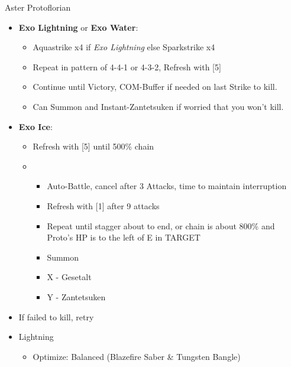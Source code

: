 \begin{battle}[1:43]{Aster Protoflorian}
\begin{itemize}
\begin{itemize}
				      \item \stagger
			      \end{itemize}
			\item \textbf{Exo Lightning} or \textbf{Exo Water}:
			      \begin{itemize}
				      \item Aquastrike x4 if \textit{Exo Lightning} else Sparkstrike x4
				      \item Repeat in pattern of 4-4-1 or 4-3-2, Refresh with [5]
				      \item Continue until Victory, COM-Buffer if needed on last Strike to kill.
				      \item Can Summon and Instant-Zantetsuken if worried that you won't kill.
			      \end{itemize}
			\item \textbf{Exo Ice}:
			      \begin{itemize}
				      \item Refresh with [5] until 500\% chain
				      \item \sixth
				            \begin{itemize}
					            \item Auto-Battle, cancel after 3 Attacks, time to maintain interruption
					            \item Refresh with [1] after 9 attacks
					            \item Repeat until stagger about to end, or chain is about 800\% and Proto's HP is to the left of E in TARGET
					            \item Summon
					            \item X - Gesetalt
					            \item Y - Zantetsuken
				            \end{itemize}
			      \end{itemize}
			\item If failed to kill, retry
		\end{itemize}
\end{battle}
	\begin{menu}
		\begin{itemize}
			\equip
			\begin{itemize}
				\item Lightning
				      \begin{itemize}
					      \item Optimize: Balanced (Blazefire Saber \& Tungsten Bangle)
				      \end{itemize}
			\end{itemize}
		\end{itemize}
	\end{menu}

	\vfill
\ 
\columnbreak